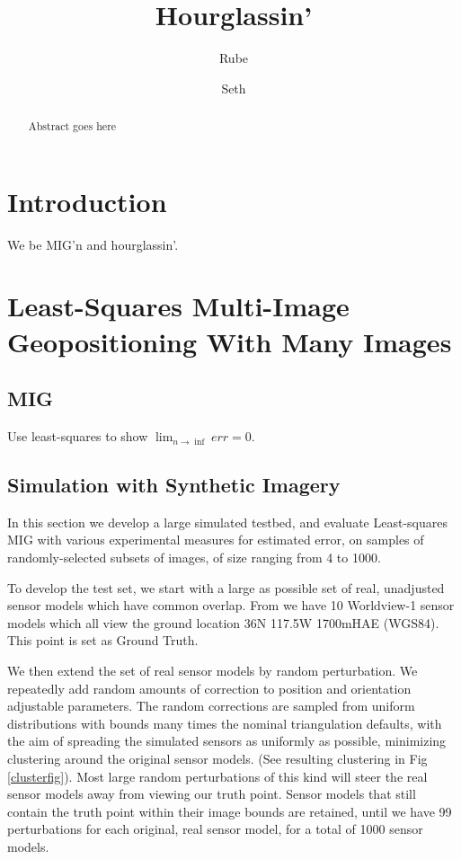 \documentclass{amsart}
\begin{document}
\newcommand{\Iimg}{\mathcal{I}}
\newcommand{\Pimg}{\mathcal{P}}

\title{Hourglassin'}
\author{Rube}
\author{Seth}
\begin{abstract}
Abstract goes here
\end{abstract}
\maketitle

\section{Introduction}
We be MIG'n and hourglassin'.

\section{Least-Squares Multi-Image Geopositioning With Many Images}
\subsection{MIG}\label{MIG}
Use least-squares to show
$\lim_{n\rightarrow\inf}err=0$.

\subsection{Simulation with Synthetic Imagery}
In this section we develop a large simulated testbed, and evaluate Least-squares
MIG with various experimental measures for estimated error, on samples of
randomly-selected subsets of images, of size ranging from 4 to 1000.

To develop the test set, we start with a large as possible set of real,
unadjusted sensor models which have common overlap. From \cite{MIN} we have 10
Worldview-1 sensor models which all view the ground location 36N 117.5W 1700mHAE
(WGS84). This point is set as Ground Truth.

We then extend the set of real sensor models by random perturbation. We
repeatedly add random amounts of correction to position and orientation
adjustable parameters. The random corrections are sampled from uniform
distributions with bounds many times the nominal triangulation defaults, with
the aim of spreading the simulated sensors as uniformly as possible, minimizing
clustering around the original sensor models. (See resulting clustering in Fig
\ref{clusterfig}). Most large random perturbations of this kind will steer the
real sensor models away from viewing our truth point. Sensor models that still
contain the truth point within their image bounds are retained, until we have 99
perturbations for each original, real sensor model, for a total of 1000 sensor
models.
\end{document}

